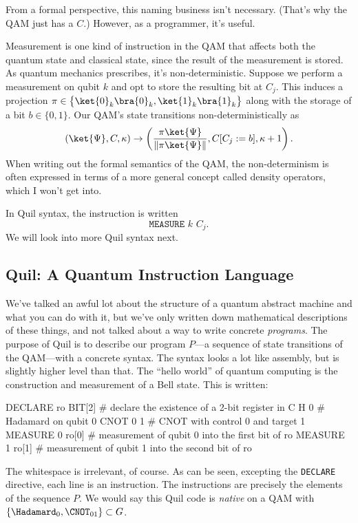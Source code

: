 From a formal perspective, this naming business isn't necessary. (That's why the QAM just has a $C$.) However, as a programmer, it's useful.

Measurement is one kind of instruction in the QAM that affects both the quantum state and classical state, since the result of the measurement is stored. As quantum mechanics prescribes, it's non-deterministic. Suppose we perform a measurement on qubit $k$ and opt to store the resulting bit at $C_j$. This induces a projection $\pi\in\big\{\ket{0}_k\bra{0}_k,\ket{1}_k\bra{1}_k\big\}$ along with the storage of a bit $b\in\{0,1\}$. Our QAM's state transitions non-deterministically as
\begin{displaymath}
(\ket{\Psi}, C, \kappa) \to \left(\frac{\pi\ket{\Psi}}{\Vert\pi\ket{\Psi}\Vert}, C[C_j:=b], \kappa+1\right).
\end{displaymath}
When writing out the formal semantics of the QAM, the non-determinism is often expressed in terms of a more general concept called density operators, which I won't get into.

In Quil syntax, the instruction is written \[\texttt{MEASURE~$k$~$C_j$}.\] We will look into more Quil syntax next.

\subsection{Quil: A Quantum Instruction Language}
We've talked an awful lot about the structure of a quantum abstract machine and what you can do with it, but we've only written down mathematical descriptions of these things, and not talked about a way to write concrete \emph{programs}. The purpose of Quil is to describe our program $P$---a sequence of state transitions of the QAM---with a concrete syntax. The syntax looks a lot like assembly, but is slightly higher level than that. The ``hello world'' of quantum computing is the construction and measurement of a Bell state. This is written:
\begin{quil}
DECLARE ro BIT[2]      # declare the existence of a 2-bit register in C
H       0              # Hadamard on qubit 0
CNOT    0 1            # CNOT with control 0 and target 1
MEASURE 0 ro[0]        # measurement of qubit 0 into the first bit of ro
MEASURE 1 ro[1]        # measurement of qubit 1 into the second bit of ro
\end{quil}

The whitespace is irrelevant, of course. As can be seen, excepting the \verb|DECLARE| directive, each line is an instruction. The instructions are precisely the elements of the sequence $P$. We would say this Quil code is \emph{native} on a QAM with $\{\Hadamard_0, \CNOT_{01}\}\subset G$.

